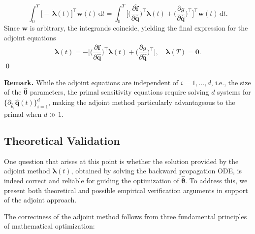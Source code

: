 $$\int_{0}^{T}
\bigl[
  -\,\dot{\bm{\lambda}}(t)
\bigr]^{\!\top}
\mathbf{w}(t)\,\mathrm{d}t
=
\int_{0}^{T}
\Biggl[
  \biggl(\dfrac{\partial\hat{\mathbf{f}}}{\partial\hat{\mathbf{q}}}\biggr)^{\!\top}\bm{\lambda}(t)
  + \biggl(\dfrac{\partial g}{\partial\hat{\mathbf{q}}}\biggr)^{\!\top}
\Biggr]^{\!\top}
\mathbf{w}(t)\,\mathrm{d}t.$$
Since $\mathbf{w}$ is arbitrary, the integrands coincide, yielding the final expression for the adjoint equations\\
$$\dot{\bm{\lambda}}(t)
= -\Biggl[
    \biggl(\dfrac{\partial\hat{\mathbf{f}}}{\partial\hat{\mathbf{q}}}\biggr)^{\!\top}\bm{\lambda}(t)
    + \biggl(\dfrac{\partial g}{\partial\hat{\mathbf{q}}}\biggr)^{\!\top}
  \Biggr],
\quad
\bm{\lambda}(T)=\bm{0}.$$
\qed

\noindent\textbf{Remark.} While the adjoint equations are independent of $i=1,\dots, d$, i.e., the size of the $\hat{\bm{\theta}}$ parameters, the primal sensitivity equations require solving $d$ systems for $\displaystyle\{\partial_{\hat{\theta}_i} \dot{\hat{\mathbf{q}}}(t)\}_{i=1}^d$, making the adjoint method particularly advantageous to the primal when $d \gg 1$.


\subsection*{Theoretical Validation}

One question that arises at this point is whether the solution provided by the adjoint method $\bm{\lambda}(t)$, obtained by solving the backward propagation ODE, is indeed correct and reliable for guiding the optimization of $\hat{\bm{\theta}}$. To address this, we present both theoretical and possible empirical verification arguments in support of the adjoint approach.

The correctness of the adjoint method follows from three fundamental principles of mathematical optimization:


